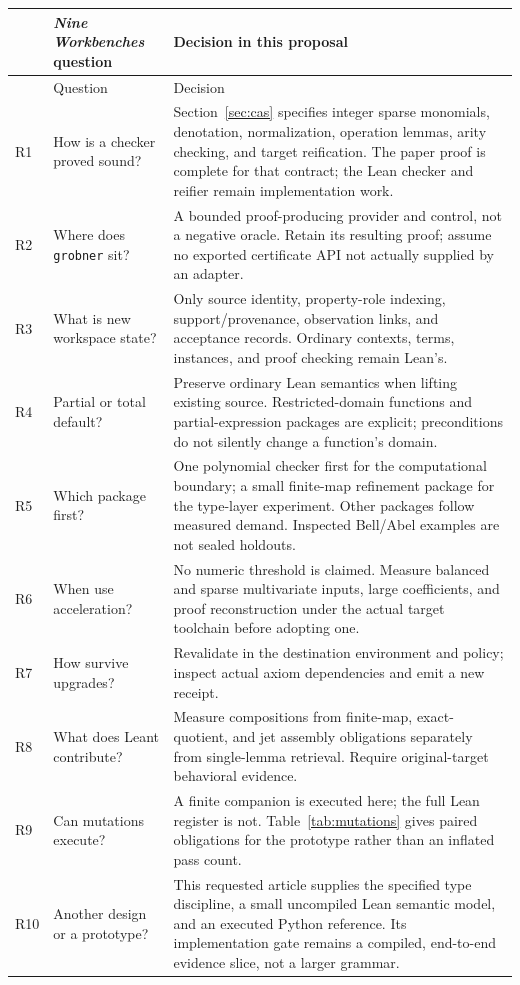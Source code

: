 \documentclass[11pt,letterpaper]{article}
\newcommand{\code}[1]{\nolinkurl{#1}}
\theoremstyle{remark}
\begin{document}
\small
\begin{longtable}{@{}P{.32in}P{1.60in}P{4.05in}@{}}
\toprule
& \emph{Nine Workbenches} question & Decision in this proposal\\
\midrule
\endfirsthead
\toprule & Question & Decision\\\midrule
\endhead
R1 & How is a checker proved sound? & Section~\ref{sec:cas} specifies integer
sparse monomials, denotation, normalization, operation lemmas, arity checking,
and target reification. The paper proof is complete for that contract; the
Lean checker and reifier remain implementation work.\\
R2 & Where does \code{grobner} sit? & A bounded proof-producing provider and
control, not a negative oracle. Retain its resulting proof; assume no exported
certificate API not actually supplied by an adapter.\\
R3 & What is new workspace state? & Only source identity, property-role
indexing, support/provenance, observation links, and acceptance records.
Ordinary contexts, terms, instances, and proof checking remain Lean's.\\
R4 & Partial or total default? & Preserve ordinary Lean semantics when lifting
existing source. Restricted-domain functions and partial-expression packages
are explicit; preconditions do not silently change a function's domain.\\
R5 & Which package first? & One polynomial checker first for the computational
boundary; a small finite-map refinement package for the type-layer experiment.
Other packages follow measured demand. Inspected Bell/Abel examples are not
sealed holdouts.\\
R6 & When use acceleration? & No numeric threshold is claimed. Measure balanced
and sparse multivariate inputs, large coefficients, and proof reconstruction
under the actual target toolchain before adopting one.\\
R7 & How survive upgrades? & Revalidate in the destination environment and
policy; inspect actual axiom dependencies and emit a new receipt.\\
R8 & What does Leant contribute? & Measure compositions from finite-map,
exact-quotient, and jet assembly obligations separately from single-lemma
retrieval. Require original-target behavioral evidence.\\
R9 & Can mutations execute? & A finite companion is executed here; the full
Lean register is not. Table~\ref{tab:mutations} gives paired obligations for the
prototype rather than an inflated pass count.\\
R10 & Another design or a prototype? & This requested article supplies the
specified type discipline, a small uncompiled Lean semantic model, and an
executed Python reference. Its implementation gate remains a compiled,
end-to-end evidence slice, not a larger grammar.\\
\bottomrule
\end{longtable}
\normalsize
\end{document}
